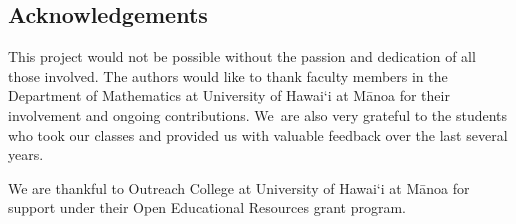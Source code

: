 
\subsection*{Acknowledgements}

This project would not be possible without the passion and dedication of all those involved. %
The authors would like to thank faculty members in the Department of Mathematics at  University of Hawai\textquoteleft i at M\=anoa for their involvement and ongoing contributions. We~are also very grateful to the students who took our classes and provided us with valuable feedback over the last several years.

We are thankful to Outreach College at University of Hawai\textquoteleft i at M\=anoa for support under their Open Educational Resources grant program.
